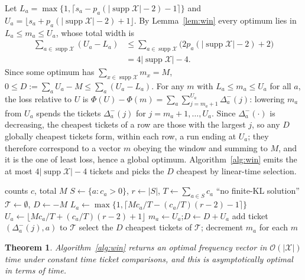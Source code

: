 \documentclass[final,5p]{elsarticle}
\newtheorem{theorem}{Theorem}
\DeclareMathOperator{\supp}{supp}
\begin{document}
Let $L_a=\max\{1,\lceil s_a-p_a(|\supp \mathcal X|-2)-1\rceil\}$ and
$U_a=\lfloor s_a+p_a(|\supp \mathcal X|-2)+1\rfloor$. By Lemma~\ref{lem:win} every
optimum lies in $L_a\le m_a\le U_a$, whose total width is
\begin{equation}
\begin{aligned}
   \sum_{a\in \supp \mathcal{X}}(U_a-L_a)&\le\sum_{a\in \supp \mathcal{X}}\bigl(2p_a(|\supp \mathcal X|-2)+2\bigr)\\&=4|\supp \mathcal X|-4 .
\end{aligned}
\end{equation}
Since some optimum has $\sum_{x\in \supp \mathcal{X}}m_x = M$, $0\le D:=\sum_a U_a-M\le\sum_a(U_a-L_a)$.
For any $m$ with $L_a\le m_a\le U_a$ for all $a$, the loss relative to $U$ is
$\Phi(U)-\Phi(m)=\sum_{a}\sum_{j=m_a+1}^{U_a}\Delta^-_a(j)$: lowering $m_a$ from
$U_a$ spends the tickets $\Delta^-_a(j)$ for $j=m_a+1,\ldots,U_a$. Since
$\Delta^-_a(\cdot)$ is decreasing, the cheapest tickets of a row are those with
the largest $j$, so any $D$ globally cheapest tickets form, within each row, a
run ending at $U_a$; they therefore correspond to a vector $m$ obeying the window
and summing to $M$, and it is the one of least loss, hence a global optimum. Algorithm~\ref{alg:win} emits the at most
$4|\supp \mathcal X|-4$ tickets and picks the $D$ cheapest by linear-time selection.

\begin{algorithm}[t]
\caption{Linear KL-optimal normalisation}
\label{alg:win}
\begin{algorithmic}[1]
\Require counts $c$, total $M$
\State $S\gets\{a:c_a>0\}$, $r\gets|S|$, $T\gets\sum_{a\in S}c_a$
 \Return ``no finite-KL solution'' \EndIf
\State $\mathcal T\gets\emptyset$, $D\gets-M$
   \State $L_a\gets\max\{1,\lceil Mc_a/T-(c_a/T)(r-2)-1\rceil\}$
   \State $U_a\gets\lfloor Mc_a/T+(c_a/T)(r-2)+1\rfloor$
   \State $m_a\gets U_a$;\quad $D\gets D+U_a$
    add ticket $(\Delta^-_a(j),a)$ to $\mathcal T$ \EndFor
\EndFor
\State select the $D$ cheapest tickets of $\mathcal T$; decrement $m_a$ for each
\State \Return $m$
\end{algorithmic}
\end{algorithm}

\begin{theorem}\label{thm:main}
Algorithm~\ref{alg:win} returns an optimal frequency vector in
$\mathcal{O}(|\mathcal{X}|)$ time under constant time ticket comparisons, and this is asymptotically optimal in terms of time.
\end{theorem}
\end{document}
